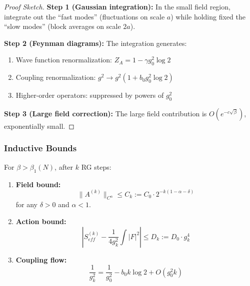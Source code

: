 \begin{proof}[Proof Sketch]
\textbf{Step 1 (Gaussian integration):}
In the small field region, integrate out the ``fast modes'' (fluctuations on scale $a$) while holding fixed the ``slow modes'' (block averages on scale $2a$).

\textbf{Step 2 (Feynman diagrams):}
The integration generates:
\begin{enumerate}
\item Wave function renormalization: $Z_A = 1 - \gamma g_0^2 \log 2$
\item Coupling renormalization: $g^2 \to g^2(1 + b_0 g_0^2 \log 2)$
\item Higher-order operators: suppressed by powers of $g_0^2$
\end{enumerate}

\textbf{Step 3 (Large field correction):}
The large field contribution is $O(e^{-c\sqrt{\beta}})$, exponentially small.
\end{proof}

\subsubsection{Inductive Bounds}

\begin{theorem}
\label{thm:balaban_induction}
For $\beta > \beta_1(N)$, after $k$ RG steps:
\begin{enumerate}
\item \textbf{Field bound:}
\begin{equation}
\|A^{(k)}\|_{C^\alpha} \leq C_k := C_0 \cdot 2^{-k(1-\alpha-\delta)}
\end{equation}
for any $\delta > 0$ and $\alpha < 1$.

\item \textbf{Action bound:}
\begin{equation}
\left|S_{eff}^{(k)} - \frac{1}{4g_k^2}\int |F|^2\right| \leq D_k := D_0 \cdot g_k^4
\end{equation}

\item \textbf{Coupling flow:}
\begin{equation}
\frac{1}{g_k^2} = \frac{1}{g_0^2} - b_0 k \log 2 + O(g_0^2 k)
\end{equation}
\end{enumerate}
\end{theorem}

